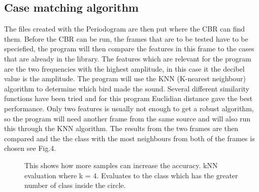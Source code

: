\subsection{Case matching algorithm}
The files created with the Periodogram are then put where the CBR can find them.
Before the CBR can be run, the frames that are to be tested have to be
speciefied, the program will then compare the features in this frame to the
cases that are already in the library. The features which are relevant for
the program are the two frequencies with the highest amplitude, in this case
it the decibel value is the amplitude. The program will use the KNN
(K-nearest neighbour) algorithm to determine which bird made the sound.
Several different similarity functions have been tried and for this program
Euclidian distance gave the best performance. Only two features is usually
not enough to get a robust algorithm, so the program will need another frame
from the same source and will also run this through the KNN algorithm. The
results from the two frames are then compared and the the class with the most
neighbours from both of the frames is chosen see Fig.4.

\begin{figure}[htp]


    \caption{This shows how more samples can increase the accuracy. kNN evaluation where k = 4. Evaluates to the class which has the greater number of class inside the circle.}
    \label{fig:featureExtraction}
\end{figure}
